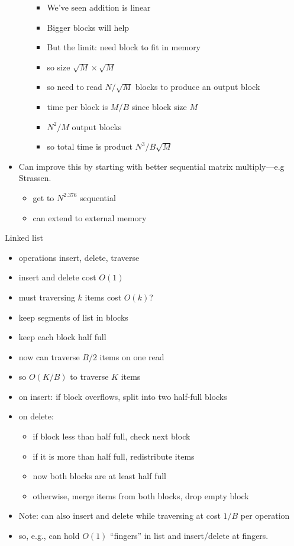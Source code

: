 \documentclass{article}
\begin{document}
\begin{itemize}
\begin{itemize}
\begin{itemize}
\item We've seen addition is linear 
\item Bigger blocks will help
\item But the limit: need block to fit in memory
\item so size $\sqrt{M} \times \sqrt{M}$
\item so need to read $N/\sqrt{M}$ blocks to produce an output block
\item time per block is $M/B$ since block size $M$
\item $N^2/M$ output blocks
\item so total time is product $N^3/B\sqrt{M}$
\end{itemize}
\end{itemize}
\item Can improve this by starting with better sequential matrix
  multiply---e.g Strassen.  
\begin{itemize}
\item get to $N^{2.376}$ sequential
\item can extend to external memory
\end{itemize}
\end{itemize}



Linked list
\begin{itemize}
\item operations insert, delete, traverse
\item insert and delete cost $O(1)$
\item must traversing $k$ items cost $O(k)$?
\item keep segments of list in blocks
\item keep each block half full
\item now can traverse $B/2$ items on one read
\item so $O(K/B)$ to traverse $K$ items
\item on insert: if block overflows, split into two half-full blocks
\item on delete:
  \begin{itemize}
  \item if block less than half full, check next block
  \item if it is more than half full, redistribute items
  \item now both blocks are at least half full
  \item otherwise, merge items from both blocks, drop empty block
  \end{itemize}
\item Note: can also insert and delete while traversing at cost $1/B$
  per operation
\item so, e.g., can hold $O(1)$ ``fingers'' in list and insert/delete
  at fingers.
\end{itemize}
\end{document}
